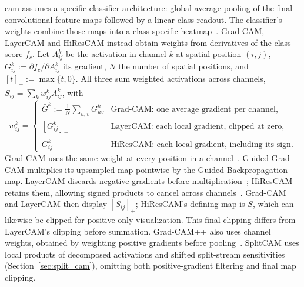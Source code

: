 \ac{cam} assumes a specific classifier architecture: global average pooling of the final convolutional feature maps followed by a linear class readout. The classifier's weights combine those maps into a class-specific heatmap~\parencite{Zhou2016}. Grad-CAM, LayerCAM and HiResCAM instead obtain weights from derivatives of the class score $f_c$. Let $A^k_{ij}$ be the activation in channel $k$ at spatial position $(i,j)$, $G^k_{ij}:=\partial f_c/\partial A^k_{ij}$ its gradient, $N$ the number of spatial positions, and $[t]_+:=\max\{t,0\}$. All three sum weighted activations across channels, $S_{ij}=\sum_k w^k_{ij}A^k_{ij}$, with
\[
 w^k_{ij}=\begin{cases}
 \displaystyle\bar G^k:=\frac{1}{N}\sum_{u,v}G^k_{uv}
   & \text{Grad-CAM: one average gradient per channel},\\[1mm]
 [G^k_{ij}]_+ & \text{LayerCAM: each local gradient, clipped at zero},\\[1mm]
 G^k_{ij} & \text{HiResCAM: each local gradient, including its sign}.
 \end{cases}
\]
Grad-CAM uses the same weight at every position in a channel~\parencite{Selvaraju2017}. Guided Grad-CAM multiplies its upsampled map pointwise by the Guided Backpropagation map. LayerCAM discards negative gradients before multiplication~\parencite{Jiang2021LayerCAM}; HiResCAM retains them, allowing signed products to cancel across channels~\parencite{Draelos2020hirescam}. Grad-CAM and LayerCAM then display $[S_{ij}]_+$; HiResCAM's defining map is $S$, which can likewise be clipped for positive-only visualization. This final clipping differs from LayerCAM's clipping before summation. Grad-CAM++ also uses channel weights, obtained by weighting positive gradients before pooling~\parencite{Chattopadhay2018}. SplitCAM uses local products of decomposed activations and shifted split-stream sensitivities (Section~\ref{sec:split_cam}), omitting both positive-gradient filtering and final map clipping.

